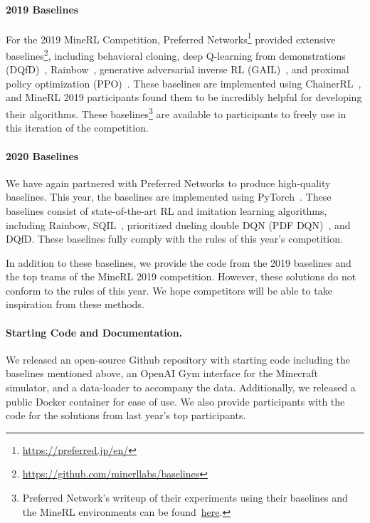 \paragraph{2019 Baselines} 
For the 2019 MineRL Competition, Preferred Networks\footnote{\url{https://preferred.jp/en/}} provided extensive baselines\footnote{\url{https://github.com/minerllabs/baselines}}, including behavioral cloning, deep Q-learning from demonstrations (DQfD)~\citep{hester2018deep}, Rainbow~\citep{hessel2018rainbow}, generative adversarial inverse RL (GAIL)~\citep{gail_2016}, and proximal policy optimization (PPO)~\citep{ppo}. 
These baselines are implemented using ChainerRL~\cite{fujita2019chainerrl}, and MineRL 2019 participants found them to be incredibly helpful for developing their algorithms.
These baselines\footnote{Preferred Network's writeup of their experiments using their baselines and the MineRL environments can be found~\href{https://github.com/minerllabs/baselines/tree/master/general/chainerrl}{here}.} are available to participants to freely use in this iteration of the competition.

\paragraph{2020 Baselines}
We have again partnered with Preferred Networks to produce high-quality baselines. This year, the baselines are implemented using PyTorch~\cite{pytorch}.
These baselines consist of state-of-the-art RL and imitation learning algorithms, including Rainbow, SQIL~\cite{reddy2019sqil}, prioritized dueling double DQN (PDF DQN)~\cite{schaul2015prioritized,van2016deep,wang2016dueling}, and DQfD.
These baselines fully comply with the rules of this year's competition.

In addition to these baselines, we provide the code from the 2019 baselines and the top teams of the MineRL 2019 competition. 
However, these solutions do not conform to the rules of this year.
We hope competitors will be able to take inspiration from these methods.

\paragraph{Starting Code and Documentation.}
We released an open-source Github repository with starting code including the baselines mentioned above,
an OpenAI Gym interface for the Minecraft simulator, and a data-loader to accompany the data. 
Additionally, we released a public Docker container for ease of use.
We also provide participants with the code for the solutions from last year's top participants.
